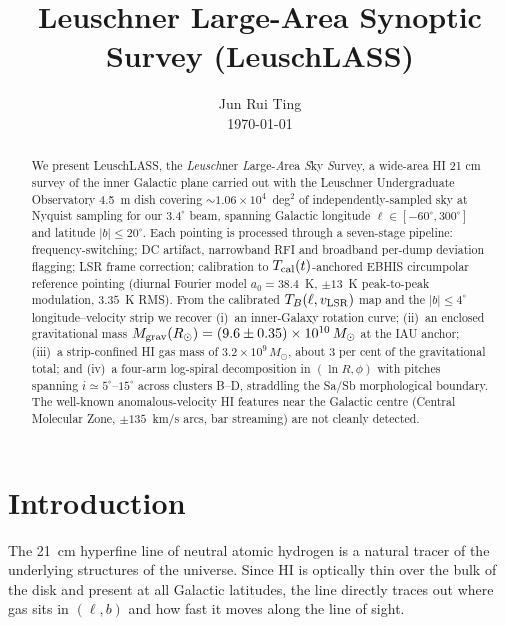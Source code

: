 \documentclass[10pt,preprint2]{aastex}
\begin{document}
\title{Leuschner Large-Area Synoptic Survey (LeuschLASS)}
\author{Jun Rui Ting \\ \today\vspace{-2.5\baselineskip}}

\begin{abstract}
We present LeuschLASS, the \emph{Leusch}ner \emph{L}arge-\emph{A}rea \emph{S}ky \emph{S}urvey, a wide-area HI 21 cm survey of the inner Galactic plane carried out with the Leuschner Undergraduate Observatory 4.5~m dish covering $\sim 1.06\times 10^{4}$~deg$^{2}$ of independently-sampled sky at Nyquist sampling for our $3.4^\circ$ beam, spanning Galactic longitude $\ell \in [-60^\circ, 300^\circ]$ and latitude $|b| \le 20^\circ$. Each pointing is processed through a seven-stage pipeline: frequency-switching; DC artifact, narrowband RFI and broadband per-dump deviation flagging; LSR frame correction; calibration to $T_{\rm cal}(t)$-anchored EBHIS circumpolar reference pointing (diurnal Fourier model $a_0 = 38.4$~K, $\pm 13$~K peak-to-peak modulation, $3.35$~K RMS). From the calibrated $T_B(\ell, v_{\rm LSR})$ map and the $|b|\le 4^\circ$ longitude--velocity strip we recover (i)~an inner-Galaxy rotation curve; (ii)~an enclosed gravitational mass $M_{\rm grav}(R_\odot) = (9.6 \pm 0.35)\times 10^{10}\,M_\odot$ at the IAU anchor; (iii)~a strip-confined HI gas mass of $3.2\times 10^{9}\,M_\odot$, about $3$ per cent of the gravitational total; and (iv)~a four-arm log-spiral decomposition in $(\ln R, \phi)$ with pitches spanning $i\simeq 5^\circ$--$15^\circ$ across clusters B--D, straddling the Sa/Sb morphological boundary. The well-known anomalous-velocity HI features near the Galactic centre (Central Molecular Zone, $\pm 135$~km/s arcs, bar streaming) are not cleanly detected.
\vspace{2.5\baselineskip}
\end{abstract}

\section{Introduction}
\label{sec:intro}

The 21~cm hyperfine line of neutral atomic hydrogen is a natural tracer of the underlying structures of the universe. Since HI is optically thin over the bulk of the disk and present at all Galactic latitudes, the line directly traces out where gas sits in $(\ell, b)$ and how fast it moves along the line of sight. 
\end{document}
